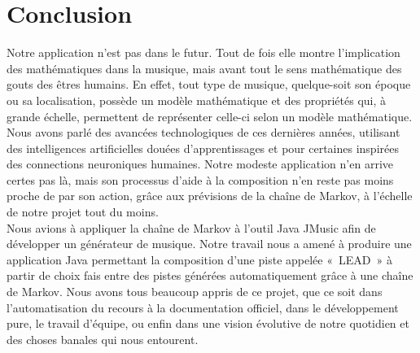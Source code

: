 \documentclass[12pt, a4paper]{article}
\begin{document}
    \section*{Conclusion}
        Notre application n’est pas dans le futur. Tout de fois elle montre l’implication des mathématiques dans la musique, mais avant tout le sens mathématique des gouts des êtres humains. En effet, tout type de musique, quelque-soit son époque ou sa localisation, possède un modèle mathématique et des propriétés qui, à grande échelle, permettent de représenter celle-ci selon un modèle mathématique. Nous avons parlé des avancées technologiques de ces dernières années, utilisant des intelligences artificielles douées d’apprentissages et pour certaines inspirées des connections neuroniques humaines. Notre modeste application n’en arrive certes pas là, mais son processus d’aide à la composition n’en reste pas moins proche de par son action, grâce aux prévisions de la chaîne de Markov, à l’échelle de notre projet tout du moins.\\
        
        Nous avions à appliquer la chaîne de Markov à l’outil Java JMusic afin de développer un générateur de musique. Notre travail nous a amené à produire une application Java  permettant la composition d’une piste appelée « LEAD » à partir de choix fais entre des pistes générées automatiquement grâce à une chaîne de Markov. Nous avons tous beaucoup appris de ce projet, que ce soit dans l’automatisation du recours à la documentation officiel, dans le développement pure, le travail d’équipe, ou enfin dans une vision évolutive de notre quotidien et des choses banales qui nous entourent.
\end{document}
